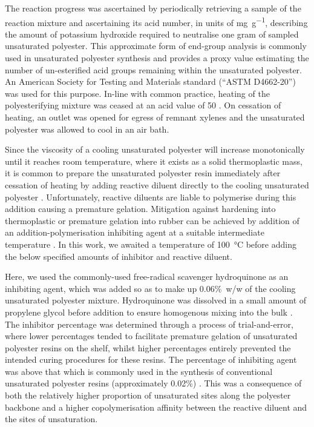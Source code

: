 The reaction progress was ascertained by periodically retrieving a sample of the
 reaction mixture and ascertaining its acid number, in units of
 \unit{\milli\gram\per\gram}, describing the amount of potassium hydroxide
 required to neutralise one gram of sampled unsaturated polyester.
This approximate form of end-group analysis is commonly used in unsaturated
 polyester synthesis \autocite{Pantic2022,Spasojevic2021,Costa2017,Parkyn1967}
 and provides a proxy value estimating the number of un-esterified acid
 groups remaining within the unsaturated polyester.
An American Society for Testing and Materials standard (``ASTM D4662-20'')
 was used for this purpose.
In-line with common practice, heating of the polyesterifying mixture was
 ceased at an acid value of 50 \autocite{Parkyn1967,Bodnar1990,Korbar1993}.
On cessation of heating, an outlet was opened for egress of remnant xylenes
 and the unsaturated polyester was allowed to cool in an air bath.

Since the viscosity of a cooling unsaturated polyester will increase 
 monotonically until it reaches room temperature, where it exists as a
 solid thermoplastic mass, it is common to prepare the unsaturated
 polyester resin immediately after cessation of heating by adding
 reactive diluent directly to the cooling unsaturated polyester
 \autocite{Parkyn1967}.
Unfortunately, reactive diluents are liable to
 polymerise during this addition causing a premature gelation.
Mitigation against hardening into thermoplastic or
 premature gelation into rubber can be achieved by addition of an 
 addition-polymerisation inhibiting agent at a suitable intermediate
 temperature \autocite{Parkyn1967,Ahamad2001,Cherian2004}.
In this work, we awaited a temperature of 100~\unit{\degreeCelsius} before 
 adding the below specified amounts of inhibitor and reactive diluent.

Here, we used the commonly-used free-radical scavenger hydroquinone
 as an inhibiting agent, which was added so as to make up
 0.06\unit{\percent}~w/w of the cooling unsaturated polyester mixture.
Hydroquinone was dissolved in a small amount of propylene glycol before
 addition to ensure homogenous mixing into the bulk
 \autocite{Parkyn1967}.
The inhibitor percentage was determined through a process of
 trial-and-error, where lower percentages tended to facilitate premature
 gelation of unsaturated polyester resins on the shelf, whilst higher
 percentages entirely prevented the intended curing procedures for these 
 resins.
The percentage of inhibiting agent was above that which is
 commonly used in the synthesis of conventional unsaturated polyester
 resins (approximately 0.02\unit{\percent}) \autocite{Parkyn1967,Cherian2004}.
This was a consequence of both the relatively higher proportion of
 unsaturated sites along the polyester backbone and a higher copolymerisation
 affinity between the reactive diluent and the sites of unsaturation.

